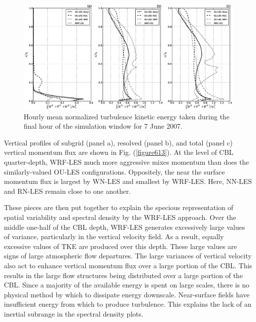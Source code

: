 \begin{figure}[H]
\begin{center}
\includegraphics[width=\textwidth]{figures/chapter6/tke_20070607}
\end{center}
\caption{Hourly mean normalized turbulence kinetic energy taken during the final hour of the simulation window for 7 June 2007.}
\label{figure612}
\end{figure}


Vertical profiles of subgrid (panel a), resolved (panel b), and total (panel c) vertical momentum flux are shown in Fig. (\autoref{figure613}). At the level of CBL quarter-depth, WRF-LES much more aggressive mixes momentum than does the similarly-valued OU-LES configurations. Oppositely, the near the surface momentum flux is largest by WN-LES and smallest by WRF-LES. Here, NN-LES and RN-LES remain close to one another. 

These pieces are then put together to explain the specious representation of spatial variability and spectral density by the WRF-LES approach. Over the middle one-half of the CBL depth, WRF-LES generates excessively large values of variance, particularly in the vertical velocity field. As a result, equally excessive values of TKE are produced over this depth. These large values are signs of large atmospheric flow departures. The large variances of vertical velocity also act to enhance vertical momentum flux over a large portion of the CBL. This results in the large flow structures being distributed over a large portion of the CBL. Since a majority of the available energy is spent on large scales, there is no physical method by which to dissipate energy downscale. Near-surface fields have insufficient energy from which to produce turbulence. This explains the lack of an inertial subrange in the spectral density plots. 

